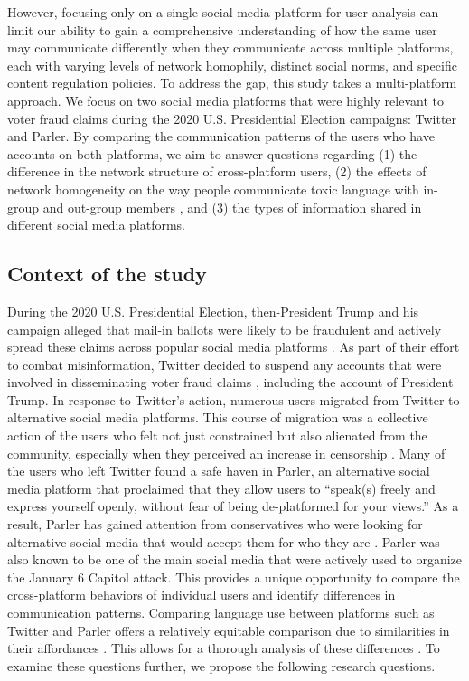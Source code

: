 \documentclass[Crown,sagev,times]{sagej}
\begin{document}
However, focusing only on a single social media platform for user analysis can limit our ability to gain a comprehensive understanding of 
how the same user may communicate differently when they communicate across multiple platforms, each with varying levels of network homophily, 
distinct social norms, and specific content regulation policies.
To address the gap, this study takes a multi-platform approach. We focus on two social media platforms that were highly relevant to 
voter fraud claims during the 2020 U.S. Presidential Election campaigns: Twitter and Parler. By comparing the communication patterns 
of the users who have accounts on both platforms, we aim to answer questions regarding 
(1) the difference in the network structure of cross-platform users, 
(2) the effects of network homogeneity on the way people communicate toxic language with in-group and out-group members
, and (3) the types of information shared in different social media platforms.

\subsection{Context of the study}

During the 2020 U.S. Presidential Election, then-President Trump and his campaign alleged that mail-in ballots were likely to be fraudulent and actively spread these claims across popular social media platforms \cite{lima2020}. As part of their effort to combat misinformation, Twitter decided to suspend any accounts that were involved in disseminating voter fraud claims \cite{twitter2021}, including the account of President Trump. In response to Twitter's action, numerous users migrated from Twitter to alternative social media platforms. This course of migration was a collective action of the users who felt not just constrained but also alienated from the community, especially when they perceived an increase in censorship \cite{kiene2016surviving}. Many of the users who left Twitter found a safe haven in Parler, an alternative social media platform that proclaimed that they allow users to ``speak(s) freely and express yourself openly, without fear of being de-platformed for your views.'' As a result, Parler has gained attention from conservatives who were looking for alternative social media that would accept them for who they are \cite{pewresearch}.
Parler was also known to be one of the main social media that were actively used to organize the January 6 Capitol attack. 
This provides a unique opportunity to compare the cross-platform behaviors of individual users and identify differences in communication patterns. 
Comparing language use between platforms such as Twitter and Parler offers a relatively equitable comparison due to similarities 
in their affordances \cite{bucher2018affordances}. This allows for a thorough analysis of these differences \cite{m2021political}. 
To examine these questions further, we propose the following research questions.
\end{document}
